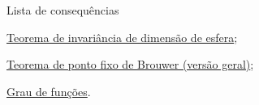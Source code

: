 \begin{titlemize}{Lista de consequências}
    \item \hyperref[teorema-de-invariancia-de-dimensao-de-esfera-prop]{Teorema de invariância de dimensão de esfera};\\
	\item \hyperref[teorema-de-ponto-fixo-de-brouwer-geral-prop]{Teorema de ponto fixo de Brouwer (versão geral)};\\
    \item \hyperref[grau-de-funcoes-em-esferas-def]{Grau de funções}.
    
\end{titlemize}
